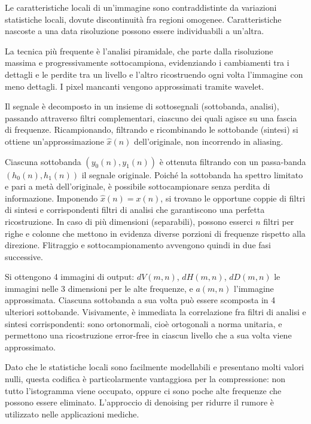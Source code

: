 Le caratteristiche locali di un'immagine sono contraddistinte da variazioni statistiche locali, dovute  discontinuità fra regioni omogenee. Caratteristiche nascoste a una data risoluzione possono essere individuabili a un'altra.

La tecnica più frequente è l'analisi piramidale, che parte dalla risoluzione massima e progressivamente sottocampiona, evidenziando i cambiamenti tra i dettagli e le perdite tra un livello e l'altro ricostruendo ogni volta l'immagine con meno dettagli. I pixel mancanti vengono approssimati tramite wavelet.

Il segnale è decomposto in un insieme di sottosegnali (sottobanda, analisi), passando attraverso filtri complementari, ciascuno dei quali agisce su una fascia di frequenze. Ricampionando, filtrando e ricombinando le sottobande (sintesi) si ottiene un'approssimazione $\hat{x}(n)$ dell'originale, non incorrendo in aliasing. 

Ciascuna sottobanda $(y_0(n), y_1(n))$ è ottenuta filtrando con un passa-banda $(h_0(n), h_1(n))$ il segnale originale. Poiché la sottobanda ha spettro limitato e pari a metà dell'originale, è possibile sottocampionare senza perdita di informazione. 
Imponendo $\hat{x}(n) = x(n)$, si trovano le opportune coppie di filtri di sintesi e corrispondenti filtri di analisi che garantiscono una perfetta ricostruzione. In caso di più dimensioni (separabili), possono esserci $n$ filtri per righe e colonne che mettono in evidenza diverse porzioni di frequenze rispetto alla direzione. Flitraggio e sottocampionamento avvengono quindi in due fasi successive.

Si ottengono 4 immagini di output: $dV(m, n)$, $dH(m, n)$, $dD(m, n)$ le immagini nelle 3 dimensioni per le alte frequenze, e $a(m, n)$ l'immagine approssimata. Ciascuna sottobanda a sua volta può essere scomposta in 4 ulteriori sottobande.
Visivamente, è immediata la correlazione fra filtri di analisi e sintesi corrispondenti: sono ortonormali, cioè ortogonali a norma unitaria, e permettono una ricostruzione error-free in ciascun livello che a sua volta viene approssimato.

Dato che le statistiche locali sono facilmente modellabili e presentano molti valori nulli, questa codifica è particolarmente vantaggiosa per la compressione: non tutto l'istogramma viene occupato, oppure ci sono poche alte frequenze che possono essere eliminato. L'approccio di denoising per ridurre il rumore è utilizzato nelle applicazioni mediche.

